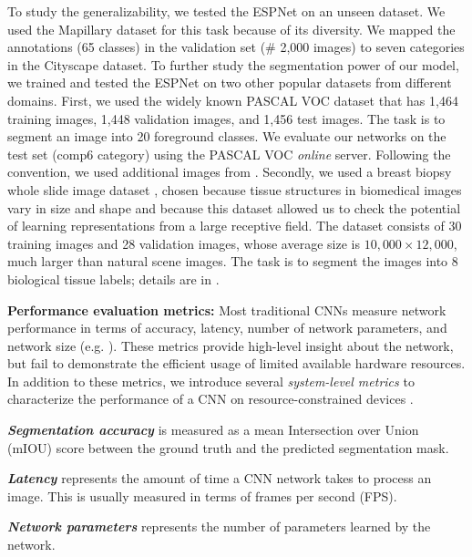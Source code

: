 \documentclass[runningheads]{llncs}
\begin{document}
To study the generalizability, we tested the ESPNet on an unseen dataset. We used the Mapillary dataset \cite{MVD2017} for this task because of its diversity. We mapped the annotations (65 classes) in the validation set (\# 2,000 images) to seven categories in the Cityscape dataset.
To further study the segmentation power of our model, we trained and tested the ESPNet on two other popular datasets from different domains. First, we used the widely known PASCAL VOC dataset \cite{everingham2010pascal} that has 1,464 training images, 1,448 validation images, and 1,456 test images. The task is to segment an image into 20 foreground classes. We evaluate our networks on the test set (comp6 category) using the PASCAL VOC \textit{online} server. Following the convention, we used additional images from \cite{hariharan2011semantic,lin2014microsoft}. Secondly, we used a breast biopsy whole slide image dataset \cite{mehta2017learning}, chosen because tissue structures in biomedical images vary in size and shape and because this dataset allowed us to check the potential of learning representations from a large receptive field. The dataset consists of 30 training images and 28 validation images, whose average size is $10,000 \times 12,000$, much larger than natural scene images. The task is to segment the images into 8 biological tissue labels; details are in \cite{mehta2017learning}.


\noindent \textbf{Performance evaluation metrics:} Most traditional CNNs measure network performance in terms of accuracy, latency, number of network parameters, and network size (e.g. \cite{howard2017mobilenets,zhang2017shufflenet,paszke2016enet,romera2018erfnet,iandola2016squeezenet}). These metrics provide high-level insight about the network, but fail to demonstrate the efficient usage of limited available hardware resources. In addition to these metrics, we introduce several \textit{system-level metrics} to characterize the performance of a CNN on resource-constrained devices \cite{yasin2014deep,wu2015performance}.


\noindent \textbf{\textit{Segmentation accuracy}} is measured as a mean Intersection over Union (mIOU) score between the ground truth and the predicted segmentation mask. 


\noindent \textbf{\textit{Latency}} represents the amount of time a CNN network takes to process an image. This is usually measured in terms of frames per second (FPS).

\noindent \textbf{\textit{Network parameters}} represents the number of parameters learned by the network. 
\end{document}
